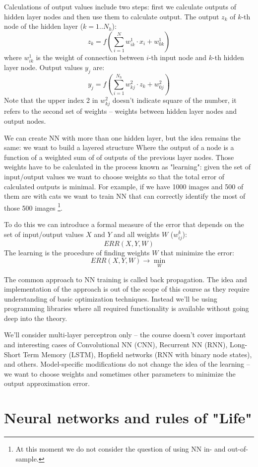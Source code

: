 Calculations of output values include two steps:
first we calculate outputs of hidden layer nodes and then use
them to calculate output. The output $z_k$ of $k$-th node of the
hidden layer ($k=1..N_h$):
$$
z_k = f( \sum_{i=1}^N w_{ik}^1\cdot x_i + w_{0k}^1 )
$$
where $w_{ik}^1$ is the weight of connection between $i$-th
input node and $k$-th hidden layer node. Output values $y_j$ are:
$$
y_j = f( \sum_{i=1}^{N_h} w_{kj}^2\cdot z_k + w_{0j}^2 )
$$
Note that the upper index 2 in $w_{kj}^2$ doesn't indicate
square of the number, it refers to the second set of weights --
weights between hidden layer nodes and output nodes.

We can create NN with more than one hidden layer, but the 
idea remains the same: we want to build a layered structure
Where the output of a node is a function of a weighted sum of
of outputs of the previous layer nodes. Those weights have to be
calculated in the process known as "learning": given the set of
input/output values we want to choose weights so that the total
error of calculated outputs is minimal. For example, if we have
1000 images and 500 of them are with cats we want to train NN
that can correctly identify the most of those 500 images
\footnote{At this moment we do not consider the question of
using NN in- and out-of-sample.}.

To do this we can introduce a formal measure of the error that
depends on the set of input/output values $X$ and $Y$ and
all weights $W$ ($w^{k}_{ij}$):
$$
ERR(X,Y,W)
$$
The learning is the procedure of finding weights $W$ that minimize
the error:
$$
ERR(X,Y,W) \rightarrow\min_{W}
$$

The common approach to NN training is called back propagation.
The idea and implementation of the approach is out of the scope of
this course as they require understanding of basic optimization
techniques. Instead we'll be using programming libraries where
all required functionality is available without going deep into
the theory.

We'll consider multi-layer perceptron only -- the course
doesn't cover important and interesting cases of Convolutional NN (CNN),
Recurrent NN (RNN), Long-Short Term Memory (LSTM),
Hopfield networks (RNN with binary node states), and others.
Model-specific modifications do not change the idea of the learning
 -- we want to choose weights and sometimes
other parameters to minimize the output approximation error.

\section{Neural networks and rules of "Life"}

